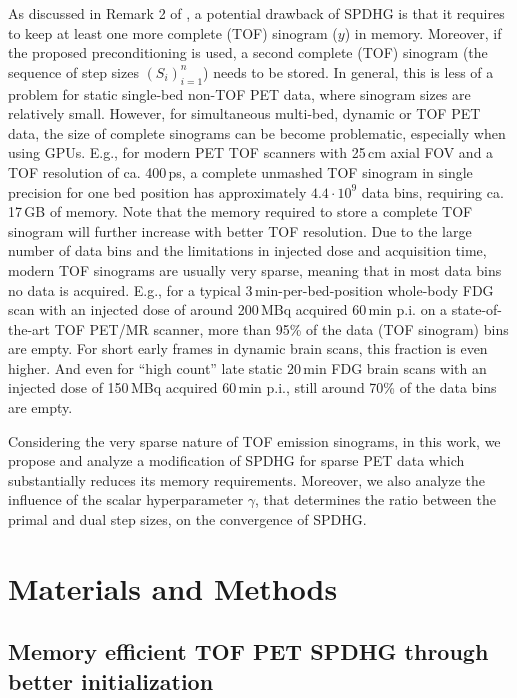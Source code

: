 \documentclass[11pt,twocolumn,twoside]{article}
\begin{document}
As discussed in Remark 2 of \cite{Ehrhardt2019}, a potential drawback of SPDHG is that it requires
to keep at least one more complete (TOF) sinogram ($y$) in memory. 
Moreover, if the proposed preconditioning is used, a second complete (TOF) sinogram
(the sequence of step sizes $(S_i)_{i=1}^n$) needs to be stored.
In general, this is less of a problem for static single-bed non-TOF PET data, where sinogram sizes
are relatively small.
However, for simultaneous multi-bed, dynamic or TOF PET data, the size of complete sinograms
can be become problematic, especially when using GPUs.
E.g., for modern PET TOF scanners with 25\,cm axial FOV and a TOF resolution of ca. 400\,ps, 
a complete unmashed TOF sinogram in single precision for one bed position 
has approximately $4.4\cdot10^9$ data bins, requiring ca. 17\,GB of memory.
Note that the memory required to store a complete TOF sinogram will further 
increase with better TOF resolution.
Due to the large number of data bins and the limitations in injected dose and acquisition time,
modern TOF sinograms are usually very sparse, meaning that in most data bins no data is
acquired.
E.g., for a typical 3\,min-per-bed-position whole-body FDG scan with an injected dose 
of around 200\,MBq acquired 60\,min p.i. on a state-of-the-art TOF PET/MR scanner, 
more than 95\% of the data (TOF sinogram) bins are empty.
For short early frames in dynamic brain scans, this fraction is even higher.
And even for ``high count'' late static 20\,min FDG brain scans with an injected dose of 150\,MBq
acquired 60\,min p.i., still around 70\% of the data bins are empty.

\smallskip

Considering the very sparse nature of TOF emission sinograms,
in this work, we propose and analyze a modification of SPDHG for sparse PET data
which substantially reduces its memory requirements.
Moreover, we also analyze the influence of the scalar hyperparameter $\gamma$, that determines
the ratio between the primal and dual step sizes, on the convergence of SPDHG.




\section{Materials and Methods}

\subsection{Memory efficient TOF PET SPDHG through better initialization}
\end{document}
